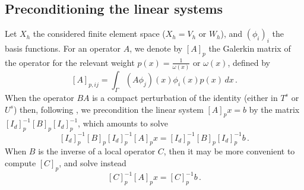 \documentclass[a4paper]{article}
\begin{document}
%
%
\subsection{Preconditioning the linear systems}
Let $X_h$ the considered finite element space ($X_h = V_h$ or $W_h$), and $(\phi_i)_{i}$ the basis functions. For an operator $A$, we denote by $\left[A\right]_p$ 
the Galerkin matrix of the operator for the relevant weight $p(x) = \frac{1}{\omega(x)}$ or $\omega(x)$, defined by
$$
[A]_{p,ij} = \int_\Gamma (A\phi_j)(x) \phi_i(x) p(x)\,dx\,.
$$
When the operator $BA$ is a compact perturbation of the identity (either in $T^s$ or $U^s$) then, following \cite{steinbach1998construction}, we 
precondition the linear system $\left[A\right]_p x = b$ by the matrix $\left[I_d\right]^{-1}_p \left[B\right]_p \left[I_d\right]_p^{-1}$, which amounts to solve
$$
\left[I_d\right]^{-1}_p \left[B\right]_p \left[I_d\right]_p^{-1} [A]_p x = \left[I_d\right]^{-1}_p \left[B\right]_p \left[I_d\right]_p^{-1} b\,.
$$
When $B$ is the inverse of a local operator $C$, then it may be more convenient to compute $\left[C\right]_p$, and solve instead
$$
\left[C\right]_p^{-1}[A]_p x = \left[C\right]_p^{-1}b\,.
$$
\end{document}
